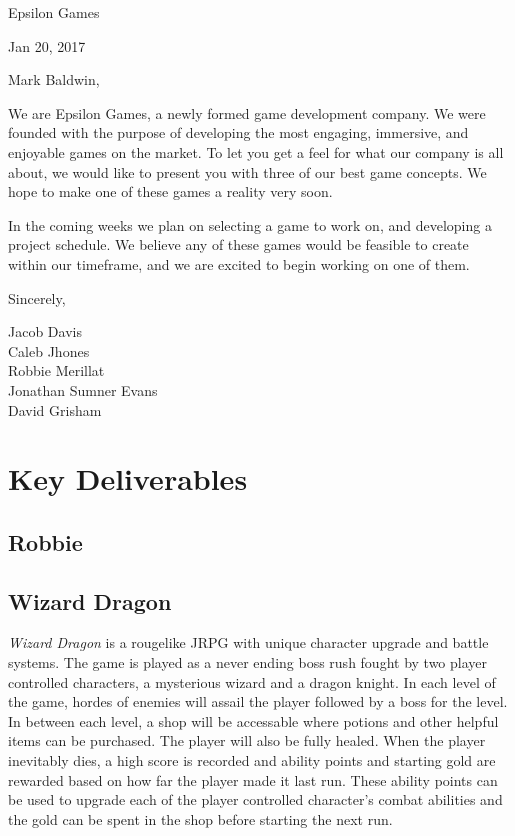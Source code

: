 \documentclass[12pt]{article}
\newcommand\tab[1][.5in]{\hspace*{#1}}
\begin{document}

\hfill Epsilon Games

\hfill Jan 20, 2017

Mark Baldwin,

We are Epsilon Games, a newly formed game development company. We were founded with the purpose of
developing the most engaging, immersive, and enjoyable games on the market. To let you get a feel
for what our company is all about, we would like to present you with three of our best game
concepts. We hope to make one of these games a reality very soon.

In the coming weeks we plan on selecting a game to work on, and developing a project schedule. We
believe any of these games would be feasible to create within our timeframe, and we are excited to
begin working on one of them.

Sincerely,

\tab Jacob Davis \\
\tab Caleb Jhones \\
\tab Robbie Merillat \\
\tab Jonathan Sumner Evans \\
\tab David Grisham \\

\newpage
\section*{Key Deliverables}

\subsection*{Robbie}


\subsection*{Wizard Dragon}
{\it Wizard Dragon} is a rougelike JRPG with unique character upgrade and battle systems. The game is played as a never ending boss rush fought by two player controlled characters, a mysterious wizard and a dragon knight. In each level of the game, hordes of enemies will assail the player followed by a boss for the level. In between each level, a shop will be accessable where potions and other helpful items can be purchased. The player will also be fully healed. When the player inevitably dies, a high score is recorded and ability points and starting gold are rewarded based on how far the player made it last run. These ability points can be used to upgrade each of the player controlled character's combat abilities and the gold can be spent in the shop before starting the next run.
\end{document}
